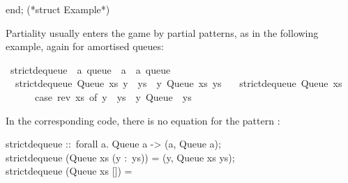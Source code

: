 \begin{isabellebody}
\begin{isamarkuptext}
\hspace*{0pt}end; (*struct Example*)%
\end{isamarkuptext}%
\isamarkuptrue%
%
\endisatagquote
{\isafoldquote}%
%
\isadelimquote
%
\endisadelimquote
%
\isamarkuptrue%
%
\begin{isamarkuptext}%
Partiality usually enters the game by partial patterns, as
  in the following example, again for amortised queues:%
\end{isamarkuptext}%
\isamarkuptrue%
%
\isadelimquote
%
\endisadelimquote
%
\isatagquote
{}\isamarkupfalse%
\ strict{\isacharunderscore}dequeue\ {\isacharcolon}{\isacharcolon}\ {\isachardoublequoteopen}{\isacharprime}a\ queue\ {\isasymRightarrow}\ {\isacharprime}a\ {\isasymtimes}\ {\isacharprime}a\ queue{\isachardoublequoteclose}\ \isanewline
\ \ {\isachardoublequoteopen}strict{\isacharunderscore}dequeue\ {\isacharparenleft}Queue\ xs\ {\isacharparenleft}y\ {\isacharhash}\ ys{\isacharparenright}{\isacharparenright}\ {\isacharequal}\ {\isacharparenleft}y{\isacharcomma}\ Queue\ xs\ ys{\isacharparenright}{\isachardoublequoteclose}\isanewline
\ \ {\isacharbar}\ {\isachardoublequoteopen}strict{\isacharunderscore}dequeue\ {\isacharparenleft}Queue\ xs\ {\isacharbrackleft}{\isacharbrackright}{\isacharparenright}\ {\isacharequal}\isanewline
\ \ \ \ \ \ {\isacharparenleft}case\ rev\ xs\ of\ y\ {\isacharhash}\ ys\ {\isasymRightarrow}\ {\isacharparenleft}y{\isacharcomma}\ Queue\ {\isacharbrackleft}{\isacharbrackright}\ ys{\isacharparenright}{\isacharparenright}{\isachardoublequoteclose}%
\endisatagquote
{\isafoldquote}%
%
\isadelimquote
%
\endisadelimquote
%
\begin{isamarkuptext}%
\noindent In the corresponding code, there is no equation
  for the pattern :%
\end{isamarkuptext}%
\isamarkuptrue%
%
\isadelimquote
%
\endisadelimquote
%
\isatagquote
%
\begin{isamarkuptext}%
\isaverbatim%
\noindent%
\hspace*{0pt}strict{}dequeue ::~forall a. Queue a -> (a, Queue a);\\
\hspace*{0pt}strict{}dequeue (Queue xs (y :~ys)) = (y, Queue xs ys);\\
\hspace*{0pt}strict{}dequeue (Queue xs []) =\\

\end{isamarkuptext}
\end{isabellebody}
